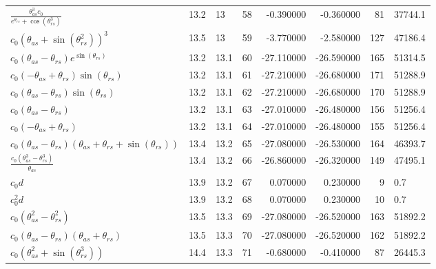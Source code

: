\begin{tabularx}{\textwidth}{lllrrrrl}
$ \displaystyle\frac{\theta_{as}^{3} c_{0}}{e^{\theta_{rs}} + \cos{\left(\theta_{rs}^{3} \right)}} $  &  13.2  &  13\phantom{.0}  &  58  &  -0.390000  &  -0.360000  &  81  &  37744.1  \\ 
$ c_{0} \left(\theta_{as} + \sin{\left(\theta_{rs}^{2} \right)}\right)^{3} $  &  13.5  &  13\phantom{.0}  &  59  &  -3.770000  &  -2.580000  &  127  &  47186.4  \\ 
$ c_{0} \left(\theta_{as} - \theta_{rs}\right) e^{\sin{\left(\theta_{rs} \right)}} $  &  13.2  &  13.1  &  60  &  -27.110000  &  -26.590000  &  165  &  51314.5  \\ 
$ c_{0} \left(- \theta_{as} + \theta_{rs}\right) \sin{\left(\theta_{rs} \right)} $  &  13.2  &  13.1  &  61  &  -27.210000  &  -26.680000  &  171  &  51288.9  \\ 
$ c_{0} \left(\theta_{as} - \theta_{rs}\right) \sin{\left(\theta_{rs} \right)} $  &  13.2  &  13.1  &  62  &  -27.210000  &  -26.680000  &  170  &  51288.9  \\ 
$ c_{0} \left(\theta_{as} - \theta_{rs}\right) $  &  13.2  &  13.1  &  63  &  -27.010000  &  -26.480000  &  156  &  51256.4  \\ 
$ c_{0} \left(- \theta_{as} + \theta_{rs}\right) $  &  13.2  &  13.1  &  64  &  -27.010000  &  -26.480000  &  155  &  51256.4  \\ 
$ c_{0} \left(\theta_{as} - \theta_{rs}\right) \left(\theta_{as} + \theta_{rs} + \sin{\left(\theta_{rs} \right)}\right) $  &  13.4  &  13.2  &  65  &  -27.080000  &  -26.530000  &  164  &  46393.7  \\ 
$ \displaystyle\frac{c_{0} \left(\theta_{as}^{3} - \theta_{rs}^{3}\right)}{\theta_{as}} $  &  13.4  &  13.2  &  66  &  -26.860000  &  -26.320000  &  149  &  47495.1  \\ 
$ c_{0} d $  &  13.9  &  13.2  &  67  &  0.070000  &  0.230000  &  9  &  0.7  \\ 
$ c_{0}^{2} d $  &  13.9  &  13.2  &  68  &  0.070000  &  0.230000  &  10  &  0.7  \\ 
$ c_{0} \left(\theta_{as}^{2} - \theta_{rs}^{2}\right) $  &  13.5  &  13.3  &  69  &  -27.080000  &  -26.520000  &  163  &  51892.2  \\ 
$ c_{0} \left(\theta_{as} - \theta_{rs}\right) \left(\theta_{as} + \theta_{rs}\right) $  &  13.5  &  13.3  &  70  &  -27.080000  &  -26.520000  &  162  &  51892.2  \\ 
$ c_{0} \left(\theta_{as}^{2} + \sin{\left(\theta_{rs}^{3} \right)}\right) $  &  14.4  &  13.3  &  71  &  -0.680000  &  -0.410000  &  87  &  26445.3  \\ 

\end{tabularx}
